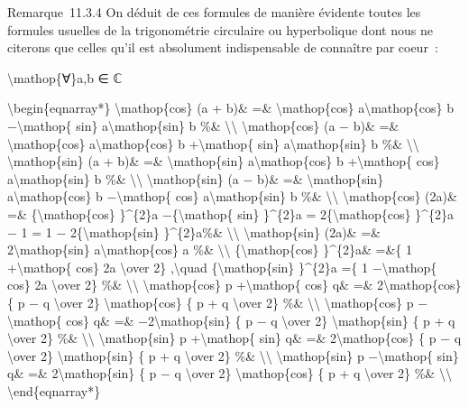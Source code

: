 \documentclass[]{article}
\begin{document}
Remarque~11.3.4 On déduit de ces formules de manière évidente toutes les
formules usuelles de la trigonométrie circulaire ou hyperbolique dont
nous ne citerons que celles qu'il est absolument indispensable de
connaître par coeur~:

\textbackslash{}mathop\{∀\}a,b ∈ ℂ

\textbackslash{}begin\{eqnarray*\} \textbackslash{}mathop\{cos\} (a +
b)\& =\& \textbackslash{}mathop\{cos\} a\textbackslash{}mathop\{cos\} b
−\textbackslash{}mathop\{ sin\} a\textbackslash{}mathop\{sin\} b \%\&
\textbackslash{}\textbackslash{} \textbackslash{}mathop\{cos\} (a − b)\&
=\& \textbackslash{}mathop\{cos\} a\textbackslash{}mathop\{cos\} b
+\textbackslash{}mathop\{ sin\} a\textbackslash{}mathop\{sin\} b \%\&
\textbackslash{}\textbackslash{} \textbackslash{}mathop\{sin\} (a + b)\&
=\& \textbackslash{}mathop\{sin\} a\textbackslash{}mathop\{cos\} b
+\textbackslash{}mathop\{ cos\} a\textbackslash{}mathop\{sin\} b \%\&
\textbackslash{}\textbackslash{} \textbackslash{}mathop\{sin\} (a − b)\&
=\& \textbackslash{}mathop\{sin\} a\textbackslash{}mathop\{cos\} b
−\textbackslash{}mathop\{ cos\} a\textbackslash{}mathop\{sin\} b \%\&
\textbackslash{}\textbackslash{} \textbackslash{}mathop\{cos\} (2a)\&
=\& \{\textbackslash{}mathop\{cos\} \}\^{}\{2\}a
−\{\textbackslash{}mathop\{ sin\} \}\^{}\{2\}a =
2\{\textbackslash{}mathop\{cos\} \}\^{}\{2\}a − 1 = 1 −
2\{\textbackslash{}mathop\{sin\} \}\^{}\{2\}a\%\&
\textbackslash{}\textbackslash{} \textbackslash{}mathop\{sin\} (2a)\&
=\& 2\textbackslash{}mathop\{sin\} a\textbackslash{}mathop\{cos\} a \%\&
\textbackslash{}\textbackslash{} \{\textbackslash{}mathop\{cos\}
\}\^{}\{2\}a\& =\&\{ 1 +\textbackslash{}mathop\{ cos\} 2a
\textbackslash{}over 2\} ,\textbackslash{}quad
\{\textbackslash{}mathop\{sin\} \}\^{}\{2\}a =\{ 1
−\textbackslash{}mathop\{ cos\} 2a \textbackslash{}over 2\} \%\&
\textbackslash{}\textbackslash{} \textbackslash{}mathop\{cos\} p
+\textbackslash{}mathop\{ cos\} q\& =\& 2\textbackslash{}mathop\{cos\}
\{ p − q \textbackslash{}over 2\} \textbackslash{}mathop\{cos\} \{ p + q
\textbackslash{}over 2\} \%\& \textbackslash{}\textbackslash{}
\textbackslash{}mathop\{cos\} p −\textbackslash{}mathop\{ cos\} q\& =\&
−2\textbackslash{}mathop\{sin\} \{ p − q \textbackslash{}over 2\}
\textbackslash{}mathop\{sin\} \{ p + q \textbackslash{}over 2\} \%\&
\textbackslash{}\textbackslash{} \textbackslash{}mathop\{sin\} p
+\textbackslash{}mathop\{ sin\} q\& =\& 2\textbackslash{}mathop\{cos\}
\{ p − q \textbackslash{}over 2\} \textbackslash{}mathop\{sin\} \{ p + q
\textbackslash{}over 2\} \%\& \textbackslash{}\textbackslash{}
\textbackslash{}mathop\{sin\} p −\textbackslash{}mathop\{ sin\} q\& =\&
2\textbackslash{}mathop\{sin\} \{ p − q \textbackslash{}over 2\}
\textbackslash{}mathop\{cos\} \{ p + q \textbackslash{}over 2\} \%\&
\textbackslash{}\textbackslash{} \textbackslash{}end\{eqnarray*\}
\end{document}
